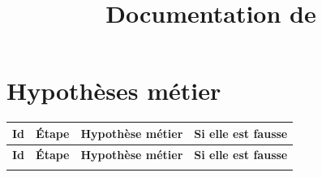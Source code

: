 \documentclass[11pt,a4paper]{article}
\title{Documentation de \code{graph\_pipeline\_prototype.ipynb}}
\author{}
\date{}
\begin{document}
\maketitle

\section{Hypothèses métier}
\label{sec:hypotheses}

{\small
\begin{longtable}{@{}l p{2.45cm} p{5.9cm} p{4.5cm}@{}}
\toprule
\textbf{Id} & \textbf{Étape} & \textbf{Hypothèse métier} & \textbf{Si elle est fausse} \\
\midrule
\endfirsthead
\toprule
\textbf{Id} & \textbf{Étape} & \textbf{Hypothèse métier} & \textbf{Si elle est fausse} \\
\midrule
\endhead
\bottomrule
\endfoot


\end{longtable}}
\end{document}
